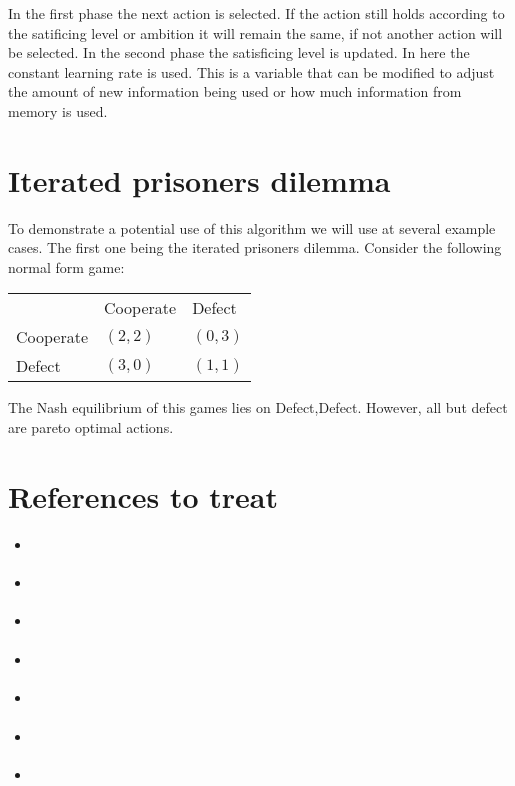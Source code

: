 In the first phase the next action is selected. If the action still holds
according to the satificing level or ambition it will remain the same, if not another
action will be selected. In the second phase the satisficing level is updated.
In here the constant learning rate is used. This is a variable that can be
modified to adjust the amount of new information being used or how much
information from memory is used.


\section{Iterated prisoners dilemma}

To demonstrate a potential use of this algorithm we will use at several example
cases. The first one being the iterated prisoners dilemma. Consider
the following normal form game:

\begin{tabular}{lll}
            & Cooperate   & Defect \\
  Cooperate & $(2,2)$     & $(0,3)$  \\
  Defect    & $(3,0)$     & $(1,1)$  \\
\end{tabular}

The Nash equilibrium of this games lies on Defect,Defect. However, all but
defect are pareto optimal actions.

\section{References to treat}
\begin{itemize}
  \item \citep{stimpson:2001}
  \item \citep{stimpson:2003}
  \item \citep{sandholm} %
  \item \citep{arthur} %
  \item \citep{bowling}
  \item \citep{feltovich}
  \item \citep{crandall}
\end{itemize}



\address{Jappie Klooster\\
  Dept. of Informatics\\
  Universiteit Utrecht\\
  The Netherlands\\}

